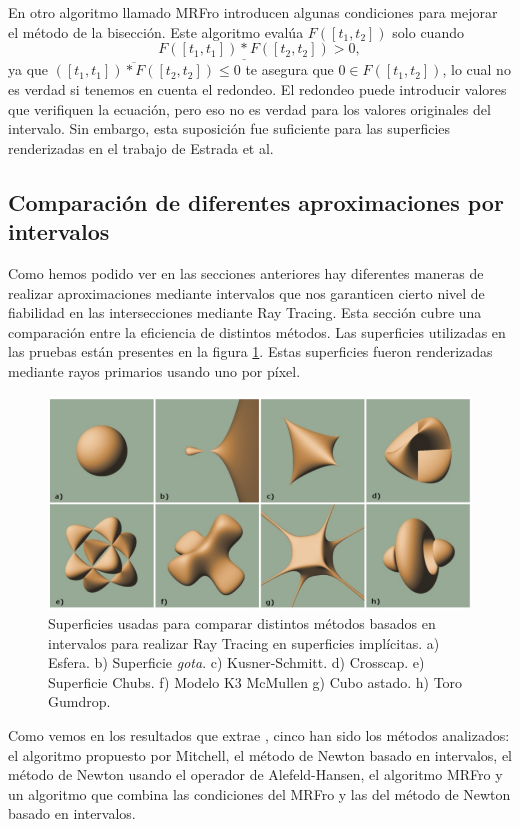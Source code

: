 En otro algoritmo llamado MRFro \cite{Estrada03} introducen algunas condiciones para mejorar el método de la bisección. Este algoritmo evalúa $F([t_1,t_2])$ solo cuando
$$\underline{F([t_1,t_1])*F([t_2,t_2])} > 0,$$
ya que $\overline{([t_1,t_1])*F([t_2,t_2])} \leq 0$ te asegura que $0 \in F([t_1,t_2])$, lo cual no es verdad si tenemos en cuenta el redondeo. El redondeo puede introducir  valores que verifiquen la ecuación, pero eso no es verdad para los valores originales del intervalo. Sin embargo, esta suposición fue suficiente para las superficies renderizadas en el trabajo de Estrada et al.

\subsection{Comparación de diferentes aproximaciones por intervalos}

Como hemos podido ver en las secciones anteriores hay diferentes maneras de realizar aproximaciones mediante intervalos que nos garanticen cierto nivel de fiabilidad en las intersecciones mediante Ray Tracing. Esta sección cubre una comparación entre la eficiencia  de distintos métodos. Las superficies utilizadas en las pruebas están presentes en la figura \ref{florez49}. Estas superficies fueron renderizadas mediante rayos primarios usando uno por píxel.
\begin{figure}[h]
	\centering
	\includegraphics[scale=0.5]{images/florez6.png}
	\caption{Superficies usadas para comparar distintos métodos basados en intervalos para realizar Ray Tracing en superficies implícitas. a) Esfera. b) Superficie{ \em gota}. c) Kusner-Schmitt. d) Crosscap. e) Superficie Chubs. f) Modelo K3 McMullen g) Cubo astado. h) Toro Gumdrop.}
	\label{florez49}
\end{figure}

Como vemos en los resultados que extrae \cite{Florez08}, cinco han sido los métodos analizados: el algoritmo propuesto por Mitchell, el método de Newton basado en intervalos, el método de Newton usando el operador de Alefeld-Hansen, el algoritmo MRFro y un algoritmo que combina las condiciones del MRFro y las del método de Newton basado en intervalos.

